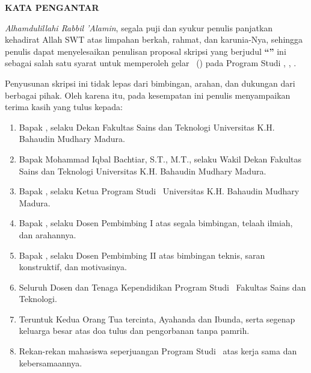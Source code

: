 
\clearpage
{}
\pagestyle{frontstyle}

\begin{center}
    {\fontsize{14pt}{18pt}\selectfont \bfseries KATA PENGANTAR}
\end{center}

\vspace{0.3cm}

\textit{Alhamdulillahi Rabbil 'Alamin}, segala puji dan syukur penulis panjatkan kehadirat Allah SWT atas limpahan berkah, rahmat, dan karunia-Nya, sehingga penulis dapat menyelesaikan penulisan proposal skripsi yang berjudul \textbf{“\skripsiJudul”} ini sebagai salah satu syarat untuk memperoleh gelar \skripsiGelar\ (\skripsiSingkatanGelar) pada Program Studi \skripsiProdi, \skripsiFakultas, \skripsiUniversitas.

Penyusunan skripsi ini tidak lepas dari bimbingan, arahan, dan dukungan dari berbagai pihak. Oleh karena itu, pada kesempatan ini penulis menyampaikan terima kasih yang tulus kepada:

\begin{enumerate}\singlespacing\setlength{\itemsep}{1.5pt}\setlength{\parsep}{0pt}\setlength{\topsep}{2pt}
    \item Bapak \skripsiDekan, selaku Dekan Fakultas Sains dan Teknologi Universitas K.H. Bahaudin Mudhary Madura.
    \item Bapak Mohammad Iqbal Bachtiar, S.T., M.T., selaku Wakil Dekan Fakultas Sains dan Teknologi Universitas K.H. Bahaudin Mudhary Madura.
    \item Bapak \skripsiKaprodi, selaku Ketua Program Studi \skripsiProdi\ Universitas K.H. Bahaudin Mudhary Madura.
    \item Bapak \skripsiPembimbingSatu, selaku Dosen Pembimbing I atas segala bimbingan, telaah ilmiah, dan arahannya.
    \item Bapak \skripsiPembimbingDua, selaku Dosen Pembimbing II atas bimbingan teknis, saran konstruktif, dan motivasinya.
    \item Seluruh Dosen dan Tenaga Kependidikan Program Studi \skripsiProdi\ Fakultas Sains dan Teknologi.
    \item Teruntuk Kedua Orang Tua tercinta, Ayahanda dan Ibunda, serta segenap keluarga besar atas doa tulus dan pengorbanan tanpa pamrih.
    \item Rekan-rekan mahasiswa seperjuangan Program Studi \skripsiProdi\ atas kerja sama dan kebersamaannya.
\end{enumerate}

